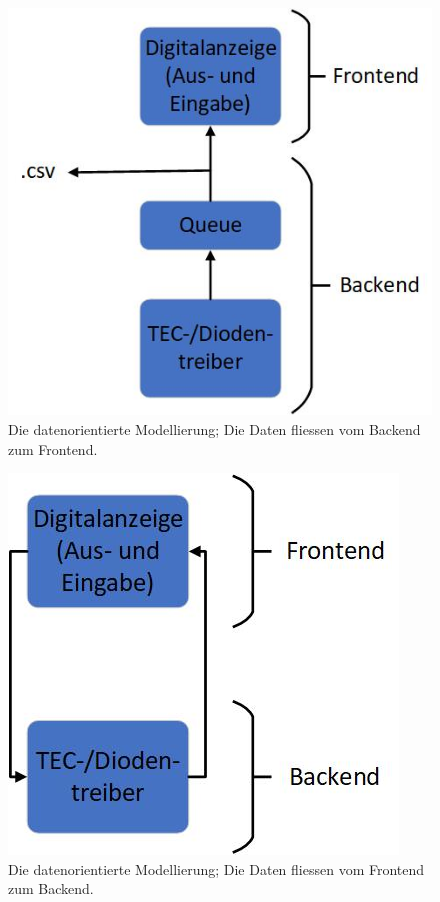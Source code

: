 
\begin{figure}[H]
    \centering
    \includegraphics[scale=0.5]{98_images/data_oriented_back_front.jpg}
    \caption{Die datenorientierte Modellierung; Die Daten fliessen vom Backend zum Frontend.}
    \label{fig:dataflow_1}
\end{figure}

\begin{figure}[H]
    \centering
    \includegraphics[scale=0.5]{98_images/data_oriented_front_back.jpg}
    \caption{Die datenorientierte Modellierung; Die Daten fliessen vom Frontend zum Backend.}
    \label{fig:dataflow_2}
\end{figure}

